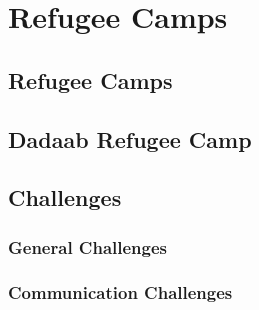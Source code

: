 \chapter{Refugee Camps}
\label{chp:refugeecamps} 

\section{Refugee Camps}

\section{Dadaab Refugee Camp}

\section{Challenges}

\subsection{General Challenges}

\subsection{Communication Challenges}

